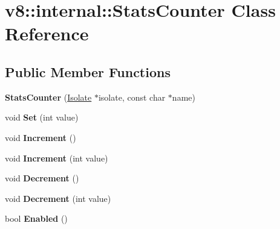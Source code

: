 \hypertarget{classv8_1_1internal_1_1_stats_counter}{}\section{v8\+:\+:internal\+:\+:Stats\+Counter Class Reference}
\label{classv8_1_1internal_1_1_stats_counter}
\subsection*{Public Member Functions}
\begin{DoxyCompactItemize}
\item 
\hypertarget{classv8_1_1internal_1_1_stats_counter_a32d87e78114fcc53ad1270af9a74c5f5}{}{\bfseries Stats\+Counter} (\hyperlink{classv8_1_1internal_1_1_isolate}{Isolate} $\ast$isolate, const char $\ast$name)\label{classv8_1_1internal_1_1_stats_counter_a32d87e78114fcc53ad1270af9a74c5f5}

\item 
\hypertarget{classv8_1_1internal_1_1_stats_counter_aab7d2cc46f664c55ce42c0e76ac1948e}{}void {\bfseries Set} (int value)\label{classv8_1_1internal_1_1_stats_counter_aab7d2cc46f664c55ce42c0e76ac1948e}

\item 
\hypertarget{classv8_1_1internal_1_1_stats_counter_a4cdc5bd23db581434e00b11dac816da4}{}void {\bfseries Increment} ()\label{classv8_1_1internal_1_1_stats_counter_a4cdc5bd23db581434e00b11dac816da4}

\item 
\hypertarget{classv8_1_1internal_1_1_stats_counter_ae4c0e7e6f3e5a9ca15a8a9a17fc39fb2}{}void {\bfseries Increment} (int value)\label{classv8_1_1internal_1_1_stats_counter_ae4c0e7e6f3e5a9ca15a8a9a17fc39fb2}

\item 
\hypertarget{classv8_1_1internal_1_1_stats_counter_aa077f958b0c5d985b577b92b9c7f39fa}{}void {\bfseries Decrement} ()\label{classv8_1_1internal_1_1_stats_counter_aa077f958b0c5d985b577b92b9c7f39fa}

\item 
\hypertarget{classv8_1_1internal_1_1_stats_counter_ad4ec0707eb464394d638340ee2f22996}{}void {\bfseries Decrement} (int value)\label{classv8_1_1internal_1_1_stats_counter_ad4ec0707eb464394d638340ee2f22996}

\item 
\hypertarget{classv8_1_1internal_1_1_stats_counter_abcc22126787bbe92b4dd31979124cf84}{}bool {\bfseries Enabled} ()\label{classv8_1_1internal_1_1_stats_counter_abcc22126787bbe92b4dd31979124cf84}


\end{DoxyCompactItemize}
